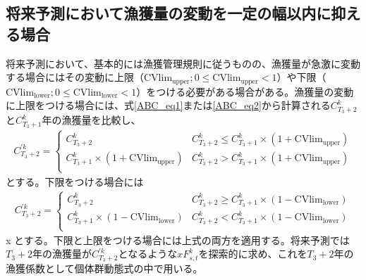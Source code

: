 \documentclass[11pt]{jsarticle}
\begin{document}
\subsection{将来予測において漁獲量の変動を一定の幅以内に抑える場合\label{CVupper}}
将来予測において、基本的には漁獲管理規則に従うものの、漁獲量が急激に変動する場合にはその変動に上限（$\mathrm{CVlim}_\mathrm{upper}; 0 \leq \mathrm{CVlim}_\mathrm{upper} < 1$）や下限（$\mathrm{CVlim}_\mathrm{lower}; 0 \leq \mathrm{CVlim}_\mathrm{lower} < 1$）をつける必要がある場合がある\cite{ichinokawa2022}。漁獲量の変動に上限をつける場合には、式\ref{ABC_eq1}または\ref{ABC_eq2}から計算される$C_{T_3+2}^k$と$C_{T_3+1}^k$年の漁獲量を比較し、
\begin{eqnarray}
  C_{T_3+2}^{'k} =
  \begin{cases}
    C_{T_3+2}^{k} & C_{T_3+2}^{k}  \le C_{T_3+1}^{k} \times (1+\mathrm{CVlim}_\mathrm{upper}) \\
    C_{T_3+1}^k \times (1+\mathrm{CVlim}_\mathrm{upper}) & C_{T_3+2}^k  > C_{T_3+1}^k \times (1+\mathrm{CVlim}_\mathrm{upper}) \\
  \end{cases}
\end{eqnarray}
とする。下限をつける場合には
\begin{eqnarray}
  C_{T_3+2}^{'k} =
  \begin{cases}
    C_{T_3+2}^k & C_{T_3+2}^k  \ge C_{T_3+1}^k \times (1-\mathrm{CVlim}_\mathrm{lower}) \\
    C_{T_3+1}^k \times (1-\mathrm{CVlim}_\mathrm{lower}) & C_{T_3+2}^k  < C_{T_3+1}^k \times (1-\mathrm{CVlim}_\mathrm{lower}) \\
  \end{cases}
\end{eqnarray}x
とする。下限と上限をつける場合には上式の両方を適用する。将来予測では$T_3+2$年の漁獲量が$C_{T_3+2}^{'k}$となるような$xF_{s,t}^k$を探索的に求め、これを$T_3+2$年の漁獲係数として個体群動態式の中で用いる。
\end{document}
